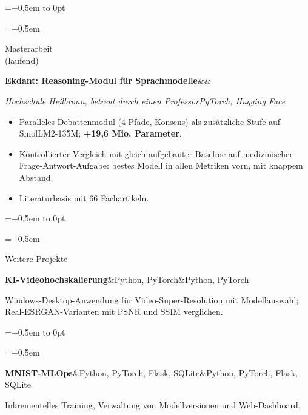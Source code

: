 \documentclass[10pt,a4paper]{article}
\newlength{\leftcol}\setlength{\leftcol}{2.45cm}
\newcommand{\gap}{0.5em}
\newcommand{\sep}{\hspace{0.45em}\textbar\hspace{0.45em}}
\newcommand{\entry}[3]{%
  \begingroup\raggedright\leftskip=\dimexpr\leftcol+\gap\relax\noindent
  \hspace*{-\dimexpr\leftcol+\gap\relax}%
  \vtop to 0pt{\hsize=\dimexpr\leftcol+\gap\relax\raggedright\small\color{mid}\noindent #1\par\vss}%
  #2\par #3\par\endgroup\vspace{5pt}}
\newcommand{\etitle}[2]{\textbf{#1}\ifx&#2&\else\textcolor{mid}{\sep}#2\fi}
\newcommand{\stack}[1]{{\small\itshape\color{mid}#1}\par\vspace{5pt}}
\begin{document}
\newpage
\entry{Masterarbeit\\(laufend)}
  {\etitle{Ekdant: Reasoning-Modul für Sprachmodelle}{}}
  {\stack{Hochschule Heilbronn, betreut durch einen Professor\sep PyTorch, Hugging Face}
  \begin{itemize}
    \item Paralleles Debattenmodul (4 Pfade, Konsens) als zusätzliche Stufe auf SmolLM2-135M; \textbf{+19,6 Mio. Parameter}.
    \item Kontrollierter Vergleich mit gleich aufgebauter Baseline auf medizinischer Frage-Antwort-Aufgabe: bestes Modell in allen Metriken vorn, mit knappem Abstand.
    \item Literaturbasis mit 66 Fachartikeln.
  \end{itemize}}
\entry{Weitere Projekte}
  {\etitle{KI-Videohochskalierung}{Python, PyTorch}}
  {\small Windows-Desktop-Anwendung für Video-Super-Resolution mit Modellauswahl; Real-ESRGAN-Varianten mit PSNR und SSIM verglichen.}
\entry{\strut}
  {\etitle{MNIST-MLOps}{Python, PyTorch, Flask, SQLite}}
  {\small Inkrementelles Training, Verwaltung von Modellversionen und Web-Dashboard.}
\end{document}
